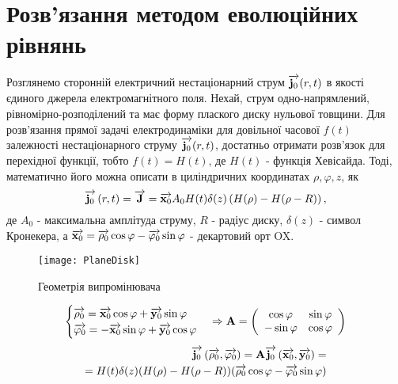 \section{Розв'язання методом еволюційних рівнянь} \label{sec:tranc_resp}
%
Розглянемо сторонній електричний нестаціонарний струм $ \overrightarrow{\mathbf j_0} (r,t) $ 
в якості єдиного джерела електромагнітного поля. Нехай, струм 
одно-напрямлений, рівномірно-розподілений та має форму плаского диску 
нульової товщини. Для розв'язання прямої задачі електродинаміки для 
довільної часової $ f(t) $ залежності нестаціонарного струму 
$ \overrightarrow{\mathbf j_0} (r,t) $, достатньо отримати розв'язок для перехідної функції, 
тобто $ f(t) = H(t) $, де $ H(t) $ - функція Хевісайда. Тоді, математично 
його можна описати в циліндричних координатах $ \rho, \varphi, z $, як
%
\begin{equation}
\overrightarrow{\mathbf j_0} \left( r, t \right) = \overrightarrow{\mathbf J} = \overrightarrow{\mathbf x_0} A_0 H(t) \delta(z) 
\left(  H(\rho) - H(\rho - R) \right),
\end{equation}
%
де $ A_0 $ - максимальна амплітуда струму, $ R $ - радіус диску,
$ \delta(z) $ - символ Кронекера, а 
$ \overrightarrow{\mathbf x_0} = \overrightarrow{\mathbf \rho_0} \cos \varphi - \overrightarrow{\mathbf \varphi_0} \sin \varphi $ 
- декартовий орт OX. 
%
\begin{figure}[htbp] \begin{center}
\texttt{[image: PlaneDisk]}
\caption{Геометрія випромінювача} \label{fig:pdisk}
\end{center} \end{figure}
%
\textcolor{blue} { \begin{equation*} \begin{aligned}
\begin{cases}
\overrightarrow{\mathbf \rho_0} = \overrightarrow{\mathbf x_0} \cos \varphi + \overrightarrow{\mathbf y_0} \sin \varphi \\
\overrightarrow{\mathbf \varphi_0} = - \overrightarrow{\mathbf x_0} \sin \varphi + \overrightarrow{\mathbf y_0} \cos \varphi
\end{cases} \Rightarrow \mathbf{A} = \left( \begin{array}{cc}
\cos \varphi & \sin \varphi \\
- \sin \varphi & \cos \varphi
\end{array} \right)
\end{aligned} \end{equation*} }
%
\textcolor{blue} { \begin{equation*} \begin{aligned}
\overrightarrow{\mathbf j_0} \left( \overrightarrow{\mathbf \rho_0}, \overrightarrow{\mathbf \varphi_0} \right) = 
\mathbf{A} \overrightarrow{\mathbf j_0} \left( \overrightarrow{\mathbf x_0}, \overrightarrow{\mathbf y_0} \right) = \\
= H(t) \delta(z) (  H(\rho) - H(\rho - R) ) 
( \overrightarrow{\mathbf \rho_0} \cos \varphi - \overrightarrow{\mathbf \varphi_0} \sin \varphi )
\end{aligned} \end{equation*} }
